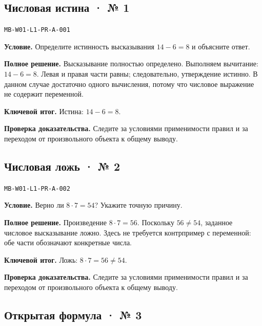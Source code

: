 \documentclass[11pt,a4paper,openany]{book}
\newcommand{\muid}[1]{\texttt{\footnotesize #1}}
\begin{document}
\subsection*{Числовая истина · № 1}\hypertarget{solution:MB-W01-L1-PR-A-001}{}

\muid{MB-W01-L1-PR-A-001}\par

\textbf{Условие.} Определите истинность высказывания $14-6=8$ и объясните ответ.\par

\textbf{Полное решение.} Высказывание полностью определено. Выполняем вычитание: $14-6=8$. Левая и правая части равны; следовательно, утверждение истинно. В данном случае достаточно одного вычисления, потому что числовое выражение не содержит переменной.


\begin{learnbox}\textbf{Ключевой итог.} Истина: $14-6=8$.\par \textbf{Проверка доказательства.} 
Следите за условиями применимости правил и за переходом от произвольного объекта к общему выводу. 
\end{learnbox}

\subsection*{Числовая ложь · № 2}\hypertarget{solution:MB-W01-L1-PR-A-002}{}

\muid{MB-W01-L1-PR-A-002}\par

\textbf{Условие.} Верно ли $8\cdot7=54$? Укажите точную причину.\par

\textbf{Полное решение.} Произведение $8\cdot7=56$. Поскольку $56\ne54$, заданное числовое высказывание ложно. Здесь не требуется контрпример с переменной: обе части обозначают конкретные числа.


\begin{learnbox}\textbf{Ключевой итог.} Ложь: $8\cdot7=56\ne54$.\par \textbf{Проверка доказательства.} 
Следите за условиями применимости правил и за переходом от произвольного объекта к общему выводу. 
\end{learnbox}

\subsection*{Открытая формула · № 3}\hypertarget{solution:MB-W01-L1-PR-A-003}{}
\end{document}
